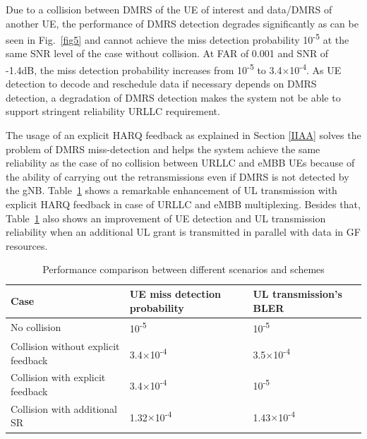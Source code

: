 \documentclass[conference]{IEEEtran}
\begin{document}
Due to a collision between DMRS of the UE of interest and data/DMRS of another UE, the performance of DMRS detection degrades significantly as can be seen in Fig.~\ref{fig5} and cannot achieve the miss detection probability 10\textsuperscript{-5} at the same SNR level of the case without collision. At FAR of 0.001 and SNR of -1.4dB, the miss detection probability increases from 10\textsuperscript{-5} to 3.4$\times$10\textsuperscript{-4}. As UE detection to decode and reschedule data if necessary depends on DMRS detection, a degradation of DMRS detection makes the system not be able to support stringent reliability URLLC requirement.

The usage of an explicit HARQ feedback as explained in Section \ref{IIAA} solves the problem of DMRS miss-detection and helps the system achieve the same reliability as the case of no collision between URLLC and eMBB UEs because of the ability of carrying out the retransmissions even if DMRS is not detected by the gNB. Table~\ref{tab2} shows a remarkable enhancement of UL transmission with explicit HARQ feedback in case of URLLC and eMBB multiplexing. Besides that, Table~\ref{tab2} also shows an improvement of UE detection and UL transmission reliability when an additional UL grant is transmitted in parallel with data in GF resources.
 

\begin{table}[htbp]
\caption{Performance comparison between different scenarios and schemes}
\begin{center}
\begin{tabular}{|p{8em}|p{8em}|p{8em}|}
 \hline
 \textbf{Case} & \textbf{UE miss detection probability}& \textbf{UL transmission's BLER}\\
 \hline
 No collision & 10\textsuperscript{-5}&10\textsuperscript{-5}\\
 \hline
 Collision without explicit feedback & 3.4$\times$10\textsuperscript{-4}&3.5$\times$10\textsuperscript{-4}\\
 \hline
 Collision with explicit feedback& 3.4$\times$10\textsuperscript{-4}&10\textsuperscript{-5}\\
\hline
 Collision with additional SR& 1.32$\times$10\textsuperscript{-4}&1.43$\times$10\textsuperscript{-4}\\

 
 \hline
\end{tabular}
\label{tab2}
\end{center}
\end{table}
\end{document}
